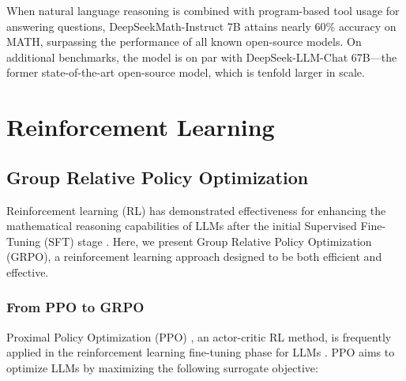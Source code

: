 When natural language reasoning is combined with program-based tool usage for answering questions, DeepSeekMath-Instruct 7B attains nearly 60\% accuracy on MATH, surpassing the performance of all known open-source models. On additional benchmarks, the model is on par with DeepSeek-LLM-Chat 67B—the former state-of-the-art open-source model, which is tenfold larger in scale.

\section{Reinforcement Learning}

\subsection{Group Relative Policy Optimization} Reinforcement learning (RL) has demonstrated effectiveness for enhancing the mathematical reasoning capabilities of LLMs after the initial Supervised Fine-Tuning (SFT) stage \citep{wang2023math,wizardmath}. Here, we present Group Relative Policy Optimization (GRPO), a reinforcement learning approach designed to be both efficient and effective.

\subsubsection{From PPO to GRPO} Proximal Policy Optimization (PPO) \citep{schulman2017proximal}, an actor-critic RL method, is frequently applied in the reinforcement learning fine-tuning phase for LLMs \citep{ouyang2022training}. PPO aims to optimize LLMs by maximizing the following surrogate objective:

